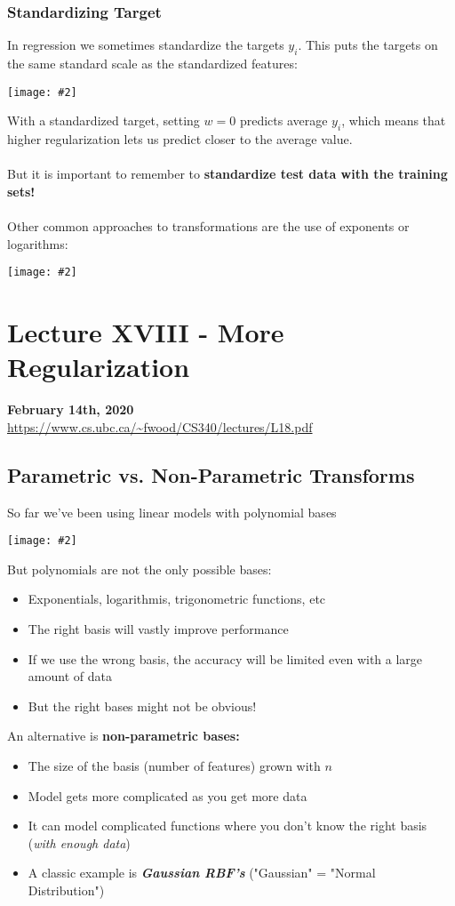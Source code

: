 \documentclass{article}
\def\blu#1{{\color{blu}#1}}
\def\gre#1{{\color{gre}#1}}
\def\red#1{{\color{red}#1}}
\newcommand{\centerfig}[2]{\begin{center}\texttt{[image: \#2]}\end{center}}
\begin{document}
\subsubsection*{Standardizing Target}
In regression we sometimes \gre{standardize the targets $ y_i $.} This puts the targets on the same standard scale as the standardized features:
\centerfig{0.5}{stand-3}
With a standardized target, setting $ w = 0 $ \gre{predicts average $ y_i $}, which means that higher regularization lets us predict closer to the average value. \\
\\
But it is important to remember to \red{\textbf{standardize test data with the training sets!}} \\
\\
Other common approaches to transformations are the use of exponents or logarithms:
\centerfig{0.5}{stand-4}

\newpage

\section*{Lecture XVIII - More Regularization}
\textbf{February 14th, 2020} \\
\url{https://www.cs.ubc.ca/~fwood/CS340/lectures/L18.pdf}

\subsection*{ Parametric vs. Non-Parametric Transforms}
So far we've been using linear models with \blu{polynomial bases}
\centerfig{0.80}{param-1}
But polynomials are not the only possible bases:
\begin{itemize}
	\item Exponentials, logarithmis, trigonometric functions, etc
	\item The \gre{right basis will vastly improve performance}
	\item If we use the wrong basis, the accuracy will be limited even with a large amount of data
	\item But the \red{right bases might not be obvious!}
\end{itemize}
An alternative is \textbf{non-parametric bases:}
\begin{itemize}
	\item The size of the basis (number of features) \gre{grown with $ n $}
	\item Model gets more complicated as you get more data
	\item It can model complicated functions where you don't know the right basis (\textsl{with enough data})
	\item A classic example is \textit{\textbf{\blu{Gaussian RBF's}}} ("Gaussian" = "Normal Distribution")
\end{itemize}
\end{document}
